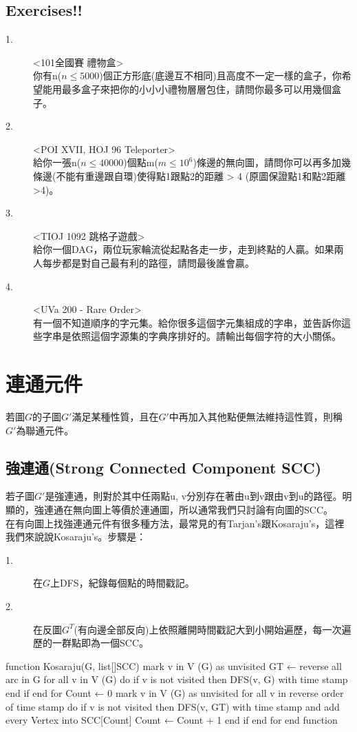 \documentclass{article}
\begin{document}
\subsection{Exercises!!}
\begin{description}
\item[ 1.]<101全國賽 禮物盒>\\
你有n($n \leq 5000$)個正方形底(底邊互不相同)且高度不一定一樣的盒子，你希望能用最多盒子來把你的小小小禮物層層包住，請問你最多可以用幾個盒子。
\item[ 2.]<POI XVII, HOJ 96 Teleporter>\\
給你一張n($n\leq 40000$)個點m($m\leq 10^6$)條邊的無向圖，請問你可以再多加幾條邊(不能有重邊跟自環)使得點1跟點2的距離 > 4 (原圖保證點1和點2距離>4)。
\item[ 3.]<TIOJ 1092 跳格子遊戲>\\
給你一個DAG，兩位玩家輪流從起點各走一步，走到終點的人贏。如果兩人每步都是對自己最有利的路徑，請問最後誰會贏。
\item[ 4.]<UVa 200 - Rare Order>\\
有一個不知道順序的字元集。給你很多這個字元集組成的字串，並告訴你這些字串是依照這個字源集的字典序排好的。請輸出每個字符的大小關係。
\end{description}


\section{連通元件}
若圖$G$的子圖$G'$滿足某種性質，且在$G'$中再加入其他點便無法維持這性質，則稱$G'$為聯通元件。
\subsection{強連通(Strong Connected Component SCC)}
若子圖$G'$是強連通，則對於其中任兩點u, v分別存在著由u到v跟由v到u的路徑。明顯的，強連通在無向圖上等價於連通圖，所以通常我們只討論有向圖的SCC。\\[2em]
在有向圖上找強連通元件有很多種方法，最常見的有Tarjan's跟Kosaraju's，這裡我們來說說Kosaraju's。步驟是：
\begin{description}
\item[ 1.]在$G$上DFS，紀錄每個點的時間戳記。
\item[ 2.]在反圖$G^T$(有向邊全部反向)上依照離開時間戳記大到小開始遍歷，每一次遍歷的一群點即為一個SCC。
\end{description}

\begin{algorithm}[caption={Kosaraju's}, label={alg1}]
function Kosaraju(G, list[]SCC)
    mark v in V (G) as unvisited
    GT ← reverse all arc in G
    for all v in V (G) do
        if v is not visited then
            DFS(v, G) with time stamp
        end if
    end for
    Count ← 0
    mark v in V (G) as unvisited
    for all v in reverse order of time stamp do
        if v is not visited then
            DFS(v, GT) with time stamp
                and add every Vertex into SCC[Count]
            Count ← Count + 1
        end if
    end for
end function
\end{algorithm}
\end{document}
